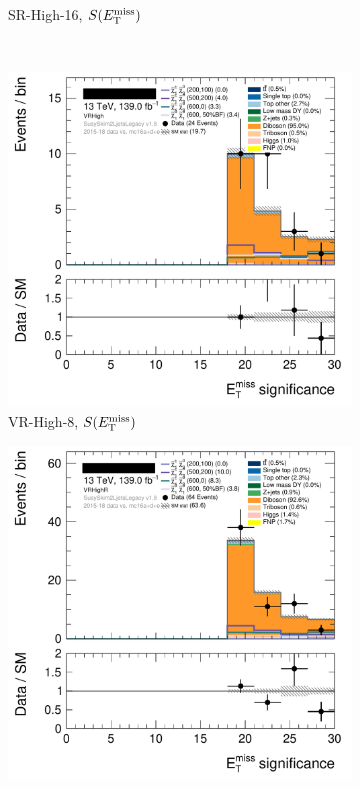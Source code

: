 \begin{figure}[tp]
\begin{subfigure}{0.495\textwidth}
\caption{SR-High-16, $S(E_\mathrm{T}^\mathrm{miss})$}
\end{subfigure}
\\[0.5em]
\begin{subfigure}{0.495\textwidth}
\centering
\includegraphics[width=\textwidth]{figures/2ljets_def_met_Sign_VRHigh.png}
\caption{VR-High-8, $S(E_\mathrm{T}^\mathrm{miss})$}
\end{subfigure}
\hfill
\begin{subfigure}{0.495\textwidth}
\centering
\includegraphics[width=\textwidth]{figures/2ljets_def_met_Sign_VRHighR.png}

\end{subfigure}
\end{figure}
